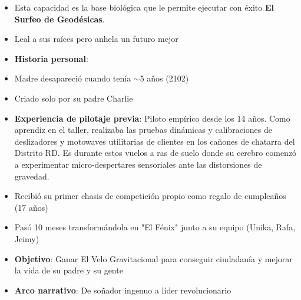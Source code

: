 \documentclass[11pt,a4paper]{report}
\begin{document}
\begin{itemize}
  \item Esta capacidad es la base biológica que le permite ejecutar con éxito \textbf{El Surfeo de Geodésicas}.
  \item Leal a sus raíces pero anhela un futuro mejor
  \item \textbf{Historia personal}:
  \item Madre desapareció cuando tenía $\sim$5 años (2102)
  \item Criado solo por su padre Charlie
  \item \textbf{Experiencia de pilotaje previa}: Piloto empírico desde los 14 años. Como aprendiz en el taller, realizaba las pruebas dinámicas y calibraciones de deslizadores y motowaves utilitarias de clientes en los cañones de chatarra del Distrito RD. Es durante estos vuelos a ras de suelo donde su cerebro comenzó a experimentar micro-despertares sensoriales ante las distorsiones de gravedad.
  \item Recibió su primer chasis de competición propio como regalo de cumpleaños (17 años)
  \item Pasó 10 meses transformándola en "El Fénix" junto a su equipo (Unika, Rafa, Jeimy)
  \item \textbf{Objetivo}: Ganar El Velo Gravitacional para conseguir ciudadanía y mejorar la vida de su padre y su gente
  \item \textbf{Arco narrativo}: De soñador ingenuo a líder revolucionario

\end{itemize}
\end{document}

